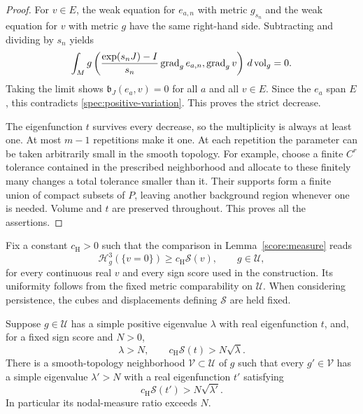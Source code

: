 \begin{proof}
For $v\in E$, the weak equation for $e_{a,n}$ with metric $g_{s_n}$
and the weak equation for $v$ with metric $g$ have the same right-hand
side.  Subtracting and dividing by $s_n$ yields
\[
 \int_M g\left(\frac{\exp(s_nJ)-I}{s_n}\operatorname{grad}_g e_{a,n},
                    \operatorname{grad}_g v\right)\,d\operatorname{vol}_g=0.
\]
Taking the limit shows $\mathfrak b_J(e_a,v)=0$ for all $a$ and all
$v\in E$.  Since the $e_a$ span $E$, this contradicts
\eqref{spec:positive-variation}.  This proves the strict decrease.

The eigenfunction $t$ survives every decrease, so the multiplicity is
always at least one.  At most $m-1$ repetitions make it one.  At each
repetition the parameter can be taken arbitrarily small in the smooth
topology.  For example, choose a finite $C^r$ tolerance contained in the
prescribed neighborhood and allocate to these finitely many changes a
total tolerance smaller than it.  Their supports form a finite union of
compact subsets of $P$, leaving another background region whenever one
is needed.  Volume and $t$ are preserved throughout.  This proves all
the assertions.
\end{proof}

Fix a constant $c_{\mathrm H}>0$ such that the comparison in
Lemma~\ref{score:measure} reads
\begin{equation}
 \mathcal H_g^3(\{v=0\})\ge c_{\mathrm H}\mathcal S(v),\qquad g\in\mathcal U,
 \label{spec:score-comparison}
\end{equation}
for every continuous real $v$ and every sign score used in the construction.
Its uniformity follows from the fixed metric comparability on
$\mathcal U$.  When considering persistence, the cubes and displacements
defining $\mathcal S$ are held fixed.

\begin{lemma}
\label{spec:persistence}
Suppose $g\in\mathcal U$ has a simple positive eigenvalue $\lambda$
with real eigenfunction $t$, and, for a fixed sign score and $N>0$,
\[
 \lambda>N,\qquad c_{\mathrm H}\mathcal S(t)>N\sqrt\lambda.
\]
There is a smooth-topology neighborhood $\mathcal V\subset\mathcal U$
of $g$ such that every $g'\in\mathcal V$ has a simple eigenvalue
$\lambda'>N$ with a real eigenfunction $t'$ satisfying
\[
 c_{\mathrm H}\mathcal S(t')>N\sqrt{\lambda'}.
\]
In particular its nodal-measure ratio exceeds $N$.
\end{lemma}

